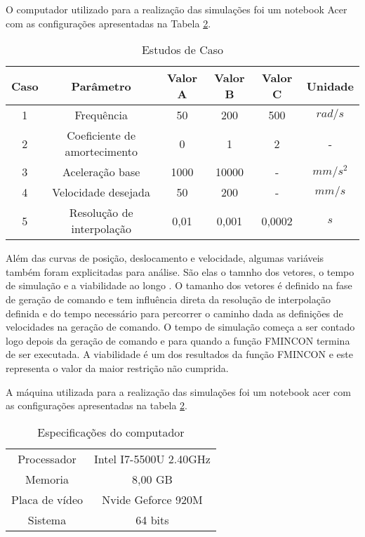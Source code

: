 O computador utilizado para a realização das simulações foi um notebook Acer com as configurações apresentadas na Tabela
\ref{tab:note_config}.

\begin{table}
    \begin{center}
    \caption{Estudos de Caso}
    \label{tab:sim_params}
    \begin{tabular}{c c c c c c}
        Caso & Parâmetro & Valor A & Valor B & Valor C & Unidade\\ \hline
        1 & Frequência & 50 & 200 & 500 & $rad/s$\\
        2 & Coeficiente de amortecimento & 0 & 1 & 2 & - \\
        3 & Aceleração base & 1000 & 10000 & - & $mm/s^2$ \\
        4 & Velocidade desejada & 50 & 200 & - & $mm/s$ \\
        5 & Resolução de interpolação & 0,01 & 0,001 & 0,0002 & $s$ \\ \hline
    \end{tabular}
    \end{center}
\end{table}

Além das curvas de posição, deslocamento e velocidade, algumas variáveis também foram explicitadas para análise.
São elas o tamnho dos vetores, o tempo de simulação e a viabilidade ao longo .
O tamanho dos vetores é definido na fase de geração de comando e tem influência direta da resolução de interpolação definida e
do tempo necessário para percorrer o caminho dada as definições de velocidades na geração de comando.
O tempo de simulação começa a ser contado logo depois da geração de comando e para quando a função FMINCON
termina de ser executada.
A viabilidade é um dos resultados da função FMINCON e este representa o valor da maior restrição não cumprida.

A máquina utilizada para a realização das simulações foi um notebook acer com as configurações apresentadas na tabela
\ref{tab:note_config}.

\begin{table}
    \begin{center}
    \caption{Especificações do computador}
    \label{tab:note_config}
    \begin{tabular}{c c}
        \hline
        Processador & Intel I7-5500U 2.40GHz \\
        Memoria & 8,00 GB \\
        Placa de vídeo & Nvide Geforce 920M \\
        Sistema & 64 bits \\ \hline
    \end{tabular}
    \end{center}
\end{table}
